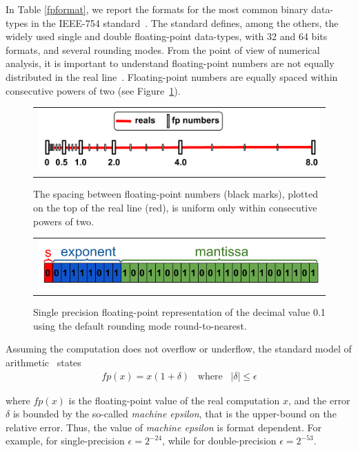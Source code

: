 In Table \ref{fpformat}, we report the formats for the most common binary data-types in the IEEE-754 standard~\cite{ieee754}.
%
The standard defines, among the others, the widely used single and double floating-point data-types, with 32 and 64 bits formats, and several rounding modes.
%
From the point of view of numerical analysis, it is important to understand floating-point numbers are not equally distributed in the real line~\cite{every}.
%
%
Floating-point numbers are equally spaced within consecutive powers of two (see Figure~\ref{fig:line}).
%
\begin{figure}[h!]
	\centering
	\begin{tabular}{l}
		\includegraphics[width=1.0\textwidth]{pic/fpnumbers.png}
	\end{tabular}
	\caption{The spacing between floating-point numbers (black marks), plotted on the top of the real line (red), is uniform only within consecutive powers of two.}
	\label{fig:line}
\end{figure}
%
\begin{figure}[h!]
	\centering
	\begin{tabular}{l}
		\includegraphics[width=1.0\textwidth]{pic/examplenumber.png}
	\end{tabular}
	\caption{Single precision floating-point representation of the decimal value 0.1 using the default rounding mode round-to-nearest.}
	\label{fig:zeropointone}
\end{figure}
%
Assuming the computation does not overflow or underflow, the standard model of arithmetic~\cite{every} states
%
\begin{align}
fp(x)=x(1+\delta)\;\;\;\text{where}\;\;\;|\delta|\leq\epsilon
\label{standard}
\end{align}
%

where $fp(x)$ is the floating-point value of the real computation $x$, and the error $\delta$ is bounded by the so-called \emph{machine epsilon}, that is the upper-bound on the relative error.
%
Thus, the value of \emph{machine epsilon} is format dependent.
%
For example, for single-precision $\epsilon=2^{-24}$, while for double-precision $\epsilon=2^{-53}$.
%

